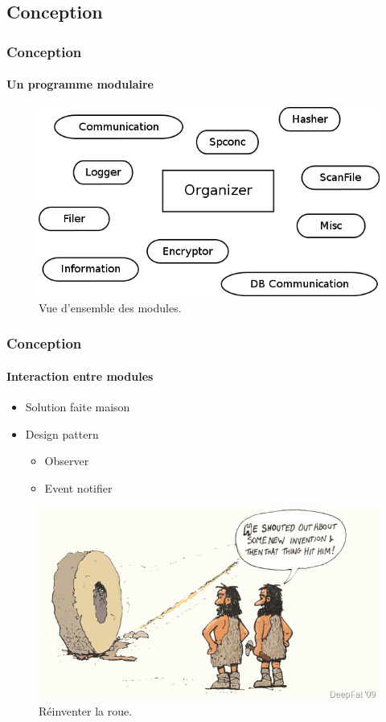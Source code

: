 \documentclass{beamer}
\begin{document}
\subsection{Conception}
\begin{frame}
 \frametitle{Conception}
 \framesubtitle{Un programme modulaire}
  \begin{figure}[h!]
    \centering
    \includegraphics[scale=0.42]{softwareDesign/overviewModule.png}
    \caption{Vue d'ensemble des modules.}
  \end{figure}
\end{frame}

\begin{frame}
 \frametitle{Conception}
 \framesubtitle{Interaction entre modules}
 \begin{minipage}{0.49\textwidth}
  \begin{itemize}
    \item Solution faite maison
    \item Design pattern
    \begin{itemize}
    \item Observer
    \item Event notifier
    \end{itemize}
  \end{itemize}
 \end{minipage}
 \begin{minipage}{0.49\textwidth}
  \begin{figure}[h!]
    \centering
    \includegraphics[scale=0.31]{presentation/new_invention.jpeg}
    \caption{Réinventer la roue\footnotemark.}
  \end{figure}
 \end{minipage}
\end{frame}
\end{document}

